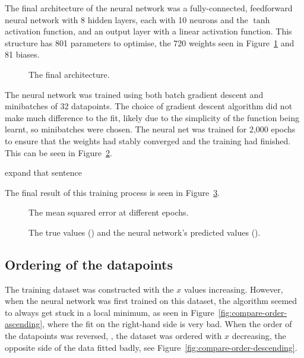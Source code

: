 The final architecture of the neural network was a fully-connected, feedforward neural network with 8 hidden layers, each with 10 neurons and the \(\tanh\) activation function, and an output layer with a linear activation function.
This structure has 801 parameters to optimise, the 720 weights seen in Figure~\ref{fig:final-ann-architecture} and 81 biases.

\begin{figure}[htbp]
	\centering
	
	\caption{The final architecture.}
	\label{fig:final-ann-architecture}
\end{figure}

The neural network was trained using both batch gradient descent and minibatches of 32 datapoints.
The choice of gradient descent algorithm did not make much difference to the fit, likely due to the simplicity of the function being learnt, so minibatches were chosen.
The neural net was trained for 2,000 epochs to ensure that the weights had stably converged and the training had finished.
This can be seen in Figure~\ref{fig:training-history}. \begin{todo}	expand that sentence\end{todo}
The final result of this training process is seen in Figure~\ref{fig:nn-fit}.

\begin{figure}[htbp]
	\centering
	
	\caption{The mean squared error at different epochs.}
	\label{fig:training-history}
\end{figure}

\begin{figure}[htbp]
	\centering
	
	\caption{The true values (\truthcolour) and the neural network's predicted values (\anncolour).}
	\label{fig:nn-fit}
\end{figure}

\subsection{Ordering of the datapoints}

The training dataset was constructed with the \(x\) values increasing.
However, when the neural network was first trained on this dataset, the algorithm seemed to always get stuck in a local minimum, as seen in Figure~\ref{fig:compare-order-ascending}, where the fit on the right-hand side is very bad.
When the order of the datapoints was reversed, \ie{}, the dataset was ordered with \(x\) decreasing, the opposite side of the data fitted badly, see Figure~\ref{fig:compare-order-descending}.

